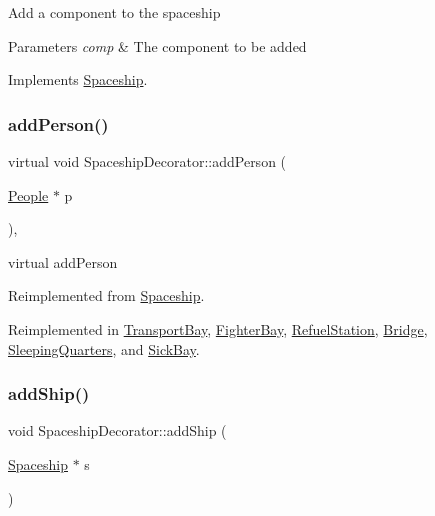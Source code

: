 Add a component to the spaceship 
\begin{DoxyParams}{Parameters}
{\em comp} & The component to be added \\
\hline
\end{DoxyParams}


Implements \hyperlink{classSpaceship_ac1b4673a691cd100708ddea08cd9f192}{Spaceship}.

\mbox{\label{classSpaceshipDecorator_a6e289d8a65f35b9f223255ae0eaa3b00}} 
\subsubsection{\texorpdfstring{add\+Person()}{addPerson()}}
{\footnotesize\ttfamily virtual void Spaceship\+Decorator\+::add\+Person (\begin{DoxyParamCaption}\item[{\hyperlink{classPeople}{People} $\ast$}]{p }\end{DoxyParamCaption})\hspace{0.3cm}{\ttfamily [inline]}, {\ttfamily [virtual]}}

virtual add\+Person 

Reimplemented from \hyperlink{classSpaceship_add8d9c6dfd5f6ecb8399e41e71e5b22f}{Spaceship}.



Reimplemented in \hyperlink{classTransportBay_a2be08f6085583ec9f839ff8939c6a6b7}{Transport\+Bay}, \hyperlink{classFighterBay_aa0777fe7c8a3e6b772fc8bf58a3cb9bb}{Fighter\+Bay}, \hyperlink{classRefuelStation_a6bd40214cf5dc4d46739943f545c6d7a}{Refuel\+Station}, \hyperlink{classBridge_aec10bfb9af885933640548b509144a29}{Bridge}, \hyperlink{classSleepingQuarters_addd107a8005b61d51846e8e955922d50}{Sleeping\+Quarters}, and \hyperlink{classSickBay_a3934a1b821fbd192a946a9aff4575afa}{Sick\+Bay}.

\mbox{\label{classSpaceshipDecorator_a5ed39419f5fab65dd4af11bf5136f7a4}} 
\subsubsection{\texorpdfstring{add\+Ship()}{addShip()}}
{\footnotesize\ttfamily void Spaceship\+Decorator\+::add\+Ship (\begin{DoxyParamCaption}\item[{\hyperlink{classSpaceship}{Spaceship} $\ast$}]{s }\end{DoxyParamCaption})\hspace{0.3cm}{\ttfamily [virtual]}}

